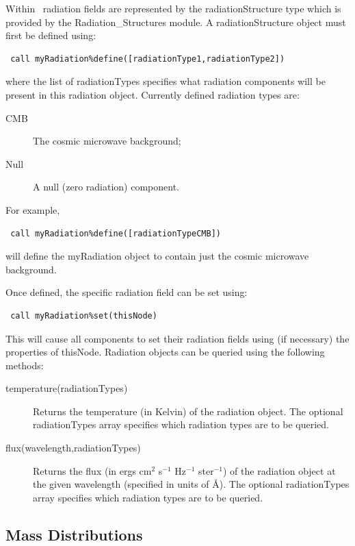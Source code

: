 Within \glc\ radiation fields are represented by the {\normalfont \ttfamily radiationStructure} type which is provided by the {\normalfont \ttfamily Radiation\_Structures} module. A {\normalfont \ttfamily radiationStructure} object must first be defined using:
\begin{verbatim}
 call myRadiation%define([radiationType1,radiationType2])
\end{verbatim}
where the list of {\normalfont \ttfamily radiationType}s specifies what radiation components will be present in this radiation object. Currently defined radiation types are:
\begin{description}
 \item[{\normalfont \ttfamily CMB}] The cosmic microwave background;
 \item[{\normalfont \ttfamily Null}] A null (zero radiation) component.
\end{description}
For example,
\begin{verbatim}
 call myRadiation%define([radiationTypeCMB])
\end{verbatim}
will define the {\normalfont \ttfamily myRadiation} object to contain just the cosmic microwave background.

Once defined, the specific radiation field can be set using:
\begin{verbatim}
 call myRadiation%set(thisNode)
\end{verbatim}
This will cause all components to set their radiation fields using (if necessary) the properties of {\normalfont \ttfamily thisNode}. Radiation objects can be queried using the following methods:
\begin{description}
 \item[{\normalfont \ttfamily temperature(radiationTypes)}] Returns the temperature (in Kelvin) of the radiation object. The optional {\normalfont \ttfamily radiationTypes} array specifies which radiation types are to be queried.
 \item[{\normalfont \ttfamily flux(wavelength,radiationTypes)}] Returns the flux (in ergs cm$^2$ s$^{-1}$ Hz$^{-1}$ ster$^{-1}$) of the radiation object at the given {\normalfont \ttfamily wavelength} (specified in units of \AA). The optional {\normalfont \ttfamily radiationTypes} array specifies which radiation types are to be queried.
\end{description}

\subsection{Mass Distributions}\label{sec:MassDistributions}

